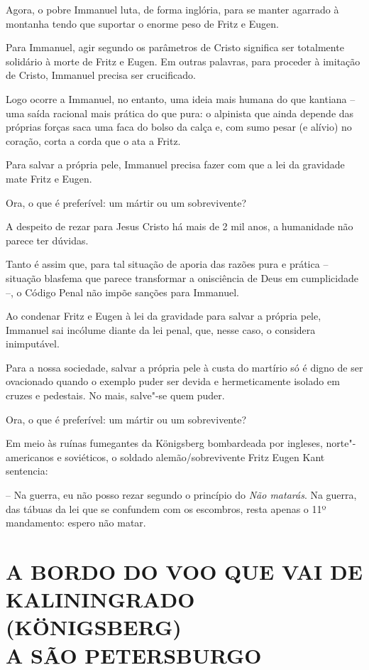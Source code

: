 Agora, o pobre Immanuel luta, de forma inglória, para se manter agarrado
à montanha tendo que suportar o enorme peso de Fritz e Eugen.

Para Immanuel, agir segundo os parâmetros de Cristo significa ser
totalmente solidário à morte de Fritz e Eugen. Em outras palavras, para
proceder à imitação de Cristo, Immanuel precisa ser crucificado.

Logo ocorre a Immanuel, no entanto, uma ideia mais humana do que
kantiana -- uma saída racional mais prática do que pura: o alpinista que
ainda depende das próprias forças saca uma faca do bolso da calça e, com
sumo pesar (e alívio) no coração, corta a corda que o ata a Fritz.

Para salvar a própria pele, Immanuel precisa fazer com que a lei da
gravidade mate Fritz e Eugen.

Ora, o que é preferível: um mártir ou um sobrevivente?

A despeito de rezar para Jesus Cristo há mais de 2 mil anos, a
humanidade não parece ter dúvidas.

Tanto é assim que, para tal situação de aporia das razões pura e prática
-- situação blasfema que parece transformar a onisciência de Deus em
cumplicidade --, o Código Penal não impõe sanções para Immanuel.

Ao condenar Fritz e Eugen à lei da gravidade para salvar a própria pele,
Immanuel sai incólume diante da lei penal, que, nesse caso, o considera
inimputável.

Para a nossa sociedade, salvar a própria pele à custa do martírio só é
digno de ser ovacionado quando o exemplo puder ser devida e
hermeticamente isolado em cruzes e pedestais. No mais, salve"-se quem
puder.

Ora, o que é preferível: um mártir ou um sobrevivente?

Em meio às ruínas fumegantes da Königsberg bombardeada por ingleses,
norte"-americanos e soviéticos, o soldado alemão/sobrevivente Fritz Eugen
Kant sentencia:

-- Na guerra, eu não posso rezar segundo o princípio do \emph{Não
matarás}. Na guerra, das tábuas da lei que se confundem com os
escombros, resta apenas o 11º mandamento: espero não matar.

\clearpage{\pagestyle{empty}\cleardoublepage}
\movetooddpage
{}
\part*{A BORDO DO VOO QUE VAI DE\\KALININGRADO (KÖNIGSBERG)\\A SÃO PETERSBURGO}

